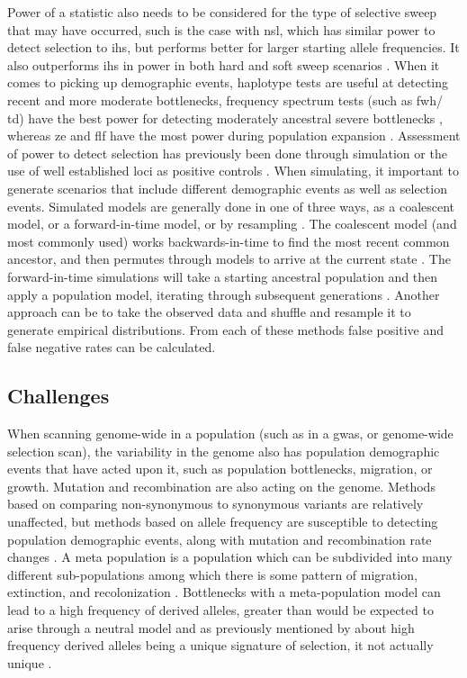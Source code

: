 \documentclass[]{report}
\begin{document}
Power of a statistic also needs to be considered for the type of
selective sweep that may have occurred, such is the case with \gls{nsl},
which has similar power to detect selection to \gls{ihs}, but performs
better for larger starting allele frequencies. It also outperforms
\gls{ihs} in power in both hard and soft sweep scenarios
\citep{Ferrer-Admetlla2014}. When it comes to picking up demographic
events, haplotype tests are useful at detecting recent and more moderate
bottlenecks, frequency spectrum tests (such as \gls{fwh}/ \gls{td}) have
the best power for detecting moderately ancestral severe bottlenecks
\citep{Depaulis2003}, whereas \gls{ze} and \gls{flf} have the most power
during population expansion \citep{Zeng2006, Ramirez-Soriano2008}.
Assessment of power to detect selection has previously been done through
simulation or the use of well established loci as positive controls
\citep{voight2006map, Zhai2009, Cadzow2016}. When simulating, it
important to generate scenarios that include different demographic
events as well as selection events. Simulated models are generally done
in one of three ways, as a coalescent model, or a forward-in-time model,
or by resampling \citep{Yuan2012}. The coalescent model (and most
commonly used) works backwards-in-time to find the most recent common
ancestor, and then permutes through models to arrive at the current
state \citep{kingman_genealogy_1982, Yuan2012}. The forward-in-time
simulations will take a starting ancestral population and then apply a
population model, iterating through subsequent generations
\citep{peng_forward-time_2010, Yuan2012}. Another approach can be to
take the observed data and shuffle and resample it to generate empirical
distributions. From each of these methods false positive and false
negative rates can be calculated.

\subsection{Challenges}\label{challenges}

When scanning genome-wide in a population (such as in a \gls{gwas}, or
genome-wide selection scan), the variability in the genome also has
population demographic events that have acted upon it, such as
population bottlenecks, migration, or growth. Mutation and recombination
are also acting on the genome. Methods based on comparing non-synonymous
to synonymous variants are relatively unaffected, but methods based on
allele frequency are susceptible to detecting population demographic
events, along with mutation and recombination rate changes
\citep{Nielsen2009}. A meta population is a population which can be
subdivided into many different sub-populations among which there is some
pattern of migration, extinction, and recolonization
\citep{Wakeley2001}. Bottlenecks with a meta-population model can lead
to a high frequency of derived alleles, greater than would be expected
to arise through a neutral model \citep{Jensen2005} and as previously
mentioned by \citet{fay2000hitchhiking} about high frequency derived
alleles being a unique signature of selection, it not actually unique
\citep{Przeworski2002}.
\end{document}
